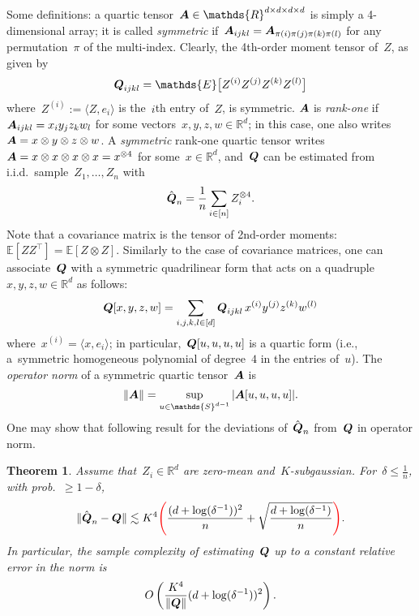 \documentclass[11pt]{article}
\newtheorem{theorem}{Theorem}%
\newcommand{\odima}[1]{{\color{red} #1}}
\newcommand{\R}{\mathds{R}}
\newcommand{\E}{\mathds{E}}
\newcommand{\Sphere}{\mathds{S}}
\newcommand{\veps}{\varepsilon}
\newcommand{\lsim}{\lesssim}
\newcommand{\rsim}{\gtrsim}
\newcommand{\leqs}{\leqslant}
\newcommand{\geqs}{\geqslant}
\renewcommand{\le}{\leqs}
\renewcommand{\ge}{\geqs}
\begin{document}
Some definitions: a quartic tensor~$\bA \in \R^{d \times d \times d \times d}$ is simply a 4-dimensional array; it is called {\em symmetric} if~$\boldsymbol{A}_{ijkl} = \boldsymbol{A}_{\pi(i)\pi(j)\pi(k)\pi(l)}$ for any permutation~$\pi$ of the multi-index. Clearly, the 4th-order moment tensor of~$Z$, as given by
\[
\bQ_{ijkl} = \E\big[Z^{(i)} Z^{(j)} Z^{(k)} Z^{(l)} \big]
\]
where~$Z^{(i)} := \langle Z, e_i \rangle$ is the~$i$th entry of~$Z$, is symmetric. $\boldsymbol{A}$ is {\em rank-one} if~$\boldsymbol{A}_{ijkl} = x_i y_j z_k w_l$ for some vectors~$x,y,z,w \in \R^d$; in this case, one also writes~$\boldsymbol{A} = x \otimes y \otimes z \otimes w$. 
A {\em symmetric} rank-one quartic tensor writes
$
\boldsymbol{A} = x \otimes x \otimes x \otimes x = x^{\otimes 4} 
$
for some~$x \in \R^d$, and~$\boldsymbol{Q}$ can be estimated from i.i.d.~sample~$Z_1, \dots, Z_n$ with 
\[
\hat {\boldsymbol{Q}}_n = \frac{1}{n} \sum_{i \in [n]} Z_i^{ \otimes 4}.
\]
Note that a covariance matrix is the tensor of 2nd-order moments:~$\E[Z Z^\top] = \E[Z \otimes Z]$. 
Similarly to the case of covariance matrices, one can associate~$\boldsymbol{Q}$  with a symmetric {quadrilinear form} that acts on a quadruple~$x,y,z,w \in \R^d$ as follows:
\[
\boldsymbol{Q}[x,y,z,w] = \sum_{i,j,k,l \in [d]}  \boldsymbol{Q}_{ijkl} \, x^{(i)} y^{(j)} z^{(k)} w^{(l)}
\]
where~$x^{(i)} = \langle x, e_i \rangle$; in particular,~$\boldsymbol{Q}[u,u,u,u]$ is a quartic form (i.e., a~symmetric homogeneous polynomial of degree~$4$ in the entries of~$u$).
The {\em operator norm} of a symmetric quartic tensor~$\boldsymbol{A}$ is
\[
\| \bA \| = \sup_{u \in \Sphere^{d-1}} |\bA[u,u,u,u]|.
\]
One may show that following result for the deviations of~$\hat {\boldsymbol{Q}}_n$ from~$\boldsymbol{Q}$ in operator norm.
 \begin{theorem}
\label{th:tensor-concentration}
Assume that~$Z_i \in \R^d$ are \odima{zero-mean} and~$K$-subgaussian. \odima{For~$\delta \le \frac{1}{n}$,} with prob.~$\ge 1-\delta$,
\[
\| \hat \bQ_n - \bQ \| \lsim K^4 \odima{\Bigg(} \frac{(d + \log(\delta^{-1}))^{2}}{n} + \sqrt{\frac{d + \log(\delta^{-1})}{n}} \odima{\Bigg)}.
\]
In particular, the sample complexity of estimating~$\boldsymbol{Q}$ up to a constant relative error in the norm is 
\[
O\left( \frac{K^4}{\|\boldsymbol{Q}\|}( d + \log(\delta^{-1}))^{2} \right).
\]
\end{theorem}

\end{document}
